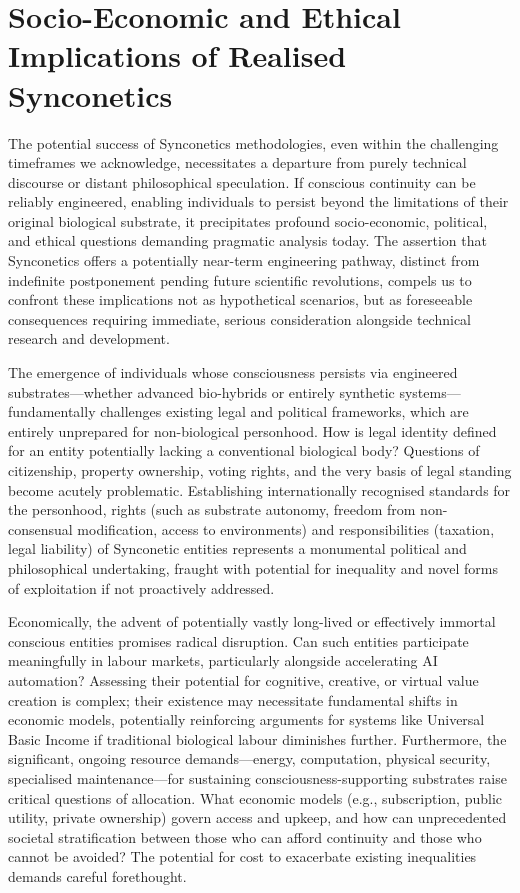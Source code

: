 \documentclass[10pt]{article}
\begin{document}
\begin{sloppypar}
  \section{Socio-Economic and Ethical Implications of Realised Synconetics}
  \label{sec:economics}

  The potential success of Synconetics methodologies, even within the challenging timeframes we acknowledge, necessitates a departure from purely technical discourse or distant philosophical speculation. If conscious continuity can be reliably engineered, enabling individuals to persist beyond the limitations of their original biological substrate, it precipitates profound socio-economic, political, and ethical questions demanding pragmatic analysis today. The assertion that Synconetics offers a potentially near-term engineering pathway, distinct from indefinite postponement pending future scientific revolutions, compels us to confront these implications not as hypothetical scenarios, but as foreseeable consequences requiring immediate, serious consideration alongside technical research and development.

  The emergence of individuals whose consciousness persists via engineered substrates—whether advanced bio-hybrids or entirely synthetic systems—fundamentally challenges existing legal and political frameworks, which are entirely unprepared for non-biological personhood. How is legal identity defined for an entity potentially lacking a conventional biological body? Questions of citizenship, property ownership, voting rights, and the very basis of legal standing become acutely problematic. Establishing internationally recognised standards for the personhood, rights (such as substrate autonomy, freedom from non-consensual modification, access to environments) and responsibilities (taxation, legal liability) of Synconetic entities represents a monumental political and philosophical undertaking, fraught with potential for inequality and novel forms of exploitation if not proactively addressed.

  Economically, the advent of potentially vastly long-lived or effectively immortal conscious entities promises radical disruption. Can such entities participate meaningfully in labour markets, particularly alongside accelerating AI automation? Assessing their potential for cognitive, creative, or virtual value creation is complex; their existence may necessitate fundamental shifts in economic models, potentially reinforcing arguments for systems like Universal Basic Income if traditional biological labour diminishes further. Furthermore, the significant, ongoing resource demands—energy, computation, physical security, specialised maintenance—for sustaining consciousness-supporting substrates raise critical questions of allocation. What economic models (e.g., subscription, public utility, private ownership) govern access and upkeep, and how can unprecedented societal stratification between those who can afford continuity and those who cannot be avoided? The potential for cost to exacerbate existing inequalities demands careful forethought.


\end{sloppypar}
\end{document}
